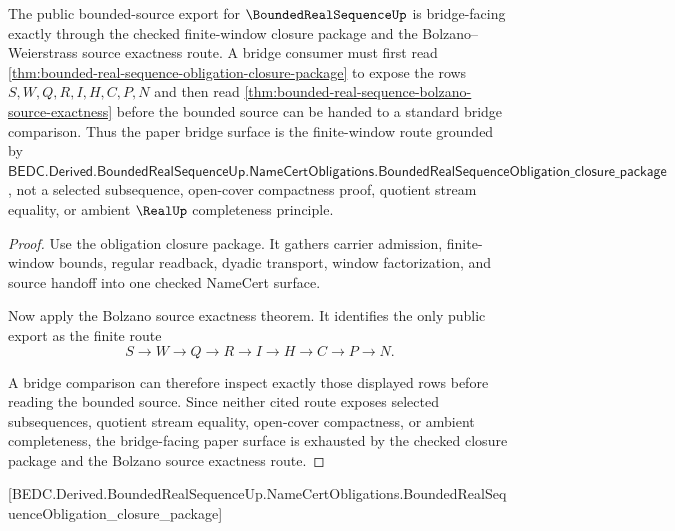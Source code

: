 \begin{theorem}
\label{thm:bounded-real-sequence-bridge-facing-route}
The public bounded-source export for $\BoundedRealSequenceUp$ is bridge-facing exactly through the checked finite-window closure package and the Bolzano--Weierstrass source exactness route. A bridge consumer must first read \autoref{thm:bounded-real-sequence-obligation-closure-package} to expose the rows $S,W,Q,R,I,H,C,P,N$ and then read \autoref{thm:bounded-real-sequence-bolzano-source-exactness} before the bounded source can be handed to a standard bridge comparison. Thus the paper bridge surface is the finite-window route grounded by $\mathsf{BEDC.Derived.BoundedRealSequenceUp.NameCertObligations.BoundedRealSequenceObligation\_closure\_package}$, not a selected subsequence, open-cover compactness proof, quotient stream equality, or ambient $\RealUp$ completeness principle.
\end{theorem}
\begin{proof}
Use the obligation closure package. It gathers carrier admission, finite-window bounds, regular readback, dyadic transport, window factorization, and source handoff into one checked NameCert surface.

Now apply the Bolzano source exactness theorem. It identifies the only public export as the finite route
$$
S \to W \to Q \to R \to I \to H \to C \to P \to N .
$$

A bridge comparison can therefore inspect exactly those displayed rows before reading the bounded source. Since neither cited route exposes selected subsequences, quotient stream equality, open-cover compactness, or ambient completeness, the bridge-facing paper surface is exhausted by the checked closure package and the Bolzano source exactness route.
\end{proof}

[BEDC.Derived.BoundedRealSequenceUp.NameCertObligations.BoundedRealSequenceObligation\_closure\_package]

